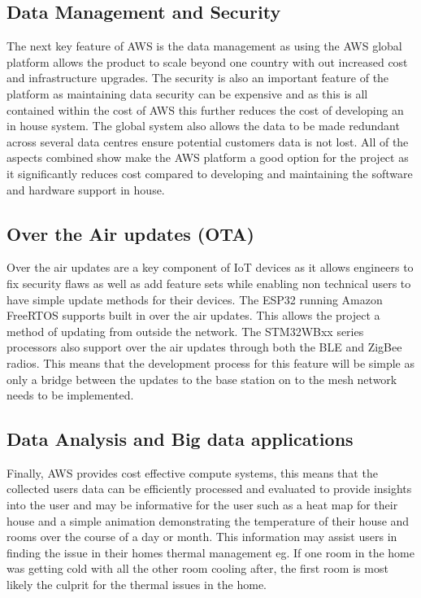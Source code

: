 \documentclass[12pt]{article}
\begin{document}
\subsection{Data Management and Security}
The next key feature of AWS is the data management as using the AWS global platform allows the
product to scale beyond one country with out increased cost and infrastructure upgrades. The
security is also an important feature of the platform as maintaining data security can be
expensive and as this is all contained within the cost of AWS this further reduces the cost of
developing an in house system. The global system also allows the data to be made redundant across
several data centres ensure potential customers data is not lost. All of the aspects combined show
make the AWS platform a good option for the project as it significantly reduces cost compared to
developing and maintaining the software and hardware support in house.

\subsection{Over the Air updates (OTA)}
Over the air updates are a key component of IoT devices as it allows engineers to fix security
flaws as well as add feature sets while enabling non technical users to have simple update methods
for their devices. The ESP32 running Amazon FreeRTOS supports built in over the air updates. This
allows the project a method of updating from outside the network. The STM32WBxx series processors
also support over the air updates through both the BLE and ZigBee radios. This means that the
development process for this feature will be simple as only a bridge between the updates to the
base station on to the mesh network needs to be implemented.

\subsection{Data Analysis and Big data applications}
Finally, AWS provides cost effective compute systems, this means that the collected users data can
be efficiently processed and evaluated to provide insights into the user and may be informative
for the user such as a heat map for their house and a simple animation demonstrating the
temperature of their house and rooms over the course of a day or month. This information may
assist users in finding the issue in their homes thermal management eg. If one room in the home
was getting cold with all the other room cooling after, the first room is most likely the culprit
for the thermal issues in the home.
\end{document}
